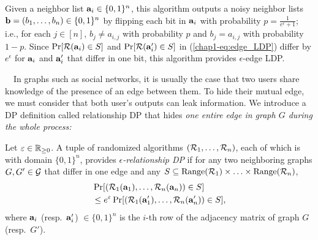 Given a neighbor list 
$\mathbf{a}_i \in \{0,1\}^n$, 
this algorithm 
outputs a noisy neighbor lists 
$\mathbf{b} = (b_1, \ldots, b_n) \in \{0,1\}^n$ 
by flipping each bit in 
$\mathbf{a}_i$ 
with probability $p = \frac{1}{e^\epsilon + 1}$; i.e., for each $j \in [n]$, 
$b_j \neq a_{i,j}$ with probability $p$ and $b_j = a_{i,j}$ with probability $1-p$. 
Since 
$\Pr[\mathcal{R}(\mathbf{a}_i) \in S]$ and $\Pr[\mathcal{R}(\mathbf{a}'_i) \in S]$ 
in (\ref{chap1-eq:edge_LDP}) differ by $e^\epsilon$ for 
$\mathbf{a}_i$ and $\mathbf{a}'_i$ 
that differ in one bit, 
this algorithm 
provides $\epsilon$-edge LDP. 

\smallskip
~~In graphs such as social networks, 
it is usually the case that two users share knowledge of the presence of an edge between them. 
To hide their mutual edge, 
we must consider
that both user's outputs can leak information. 
We introduce a DP definition called relationship DP that hides \textit{one entire edge in graph $G$ during the whole process:}


\begin{definition}  
\label{chap1-def:entire_edge_LDP} 
Let $\varepsilon \in \mathbb{R}_{\ge0}$. 
A tuple of randomized algorithms $(\mathcal{R}_1, \ldots, \mathcal{R}_n)$, 
each of which is with domain $\{0,1\}^n$, 
provides 
\emph{$\epsilon$-relationship DP} 
if for any two 
neighboring 
graphs $G, G' \in \mathcal{G}$ that differ in one edge and any $S \subseteq \mathrm{Range}(\mathcal{R}_1) \times \ldots \times \mathrm{Range}(\mathcal{R}_n)$, 
\begin{align}
&\Pr[(\mathcal{R}_1(\mathbf{a}_1), \ldots, \mathcal{R}_n(\mathbf{a}_n)) \in S] \nonumber\\
&\leq e^\varepsilon \Pr[(\mathcal{R}_1(\mathbf{a}'_1), \ldots, \mathcal{R}_n(\mathbf{a}'_n)) \in S],
\label{chap1-eq:entire_edge_LDP}
\end{align}
where $\mathbf{a}_i$ (resp.~$\mathbf{a}'_i$) $\in \{0,1\}^n$ is the $i$-th row of the adjacency matrix of graph $G$ (resp.~$G'$).
\end{definition}

